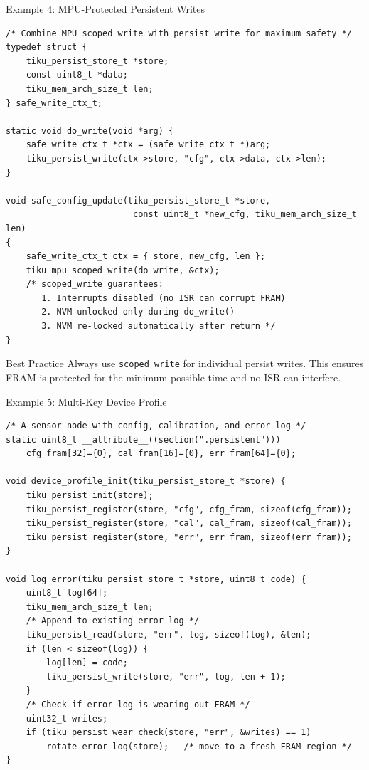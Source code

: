 \documentclass[aspectratio=169, 10pt]{beamer}
\begin{document}
\begin{frame}[fragile]{Example 4: MPU-Protected Persistent Writes}
\begin{lstlisting}[style=cstyle]
/* Combine MPU scoped_write with persist_write for maximum safety */
typedef struct {
    tiku_persist_store_t *store;
    const uint8_t *data;
    tiku_mem_arch_size_t len;
} safe_write_ctx_t;

static void do_write(void *arg) {
    safe_write_ctx_t *ctx = (safe_write_ctx_t *)arg;
    tiku_persist_write(ctx->store, "cfg", ctx->data, ctx->len);
}

void safe_config_update(tiku_persist_store_t *store,
                         const uint8_t *new_cfg, tiku_mem_arch_size_t len)
{
    safe_write_ctx_t ctx = { store, new_cfg, len };
    tiku_mpu_scoped_write(do_write, &ctx);
    /* scoped_write guarantees:
       1. Interrupts disabled (no ISR can corrupt FRAM)
       2. NVM unlocked only during do_write()
       3. NVM re-locked automatically after return */
}
\end{lstlisting}

\vspace{0.3em}
\begin{alertblock}{Best Practice}
Always use \texttt{scoped\_write} for individual persist writes. This
ensures FRAM is protected for the minimum possible time and no ISR can
interfere.
\end{alertblock}
\end{frame}

\begin{frame}[fragile]{Example 5: Multi-Key Device Profile}
\begin{lstlisting}[style=cstyle]
/* A sensor node with config, calibration, and error log */
static uint8_t __attribute__((section(".persistent")))
    cfg_fram[32]={0}, cal_fram[16]={0}, err_fram[64]={0};

void device_profile_init(tiku_persist_store_t *store) {
    tiku_persist_init(store);
    tiku_persist_register(store, "cfg", cfg_fram, sizeof(cfg_fram));
    tiku_persist_register(store, "cal", cal_fram, sizeof(cal_fram));
    tiku_persist_register(store, "err", err_fram, sizeof(err_fram));
}

void log_error(tiku_persist_store_t *store, uint8_t code) {
    uint8_t log[64];
    tiku_mem_arch_size_t len;
    /* Append to existing error log */
    tiku_persist_read(store, "err", log, sizeof(log), &len);
    if (len < sizeof(log)) {
        log[len] = code;
        tiku_persist_write(store, "err", log, len + 1);
    }
    /* Check if error log is wearing out FRAM */
    uint32_t writes;
    if (tiku_persist_wear_check(store, "err", &writes) == 1)
        rotate_error_log(store);   /* move to a fresh FRAM region */
}
\end{lstlisting}
\end{frame}
\end{document}
